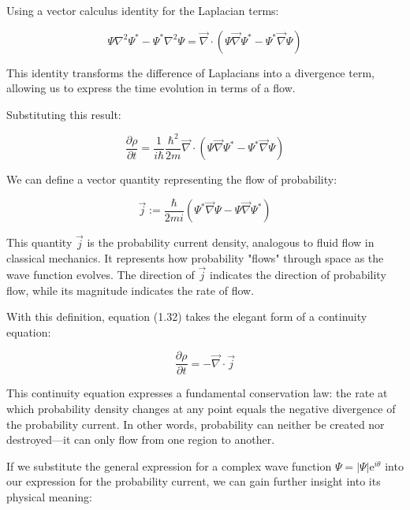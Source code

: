 \documentclass[italian]{HKNdocument}
\begin{document}
Using a vector calculus identity for the Laplacian terms:

\begin{equation*}
\Psi \nabla^{2} \Psi^{*}-\Psi^{*} \nabla^{2} \Psi=\vec{\nabla} \cdot\left(\Psi \vec{\nabla} \Psi^{*}-\Psi^{*} \vec{\nabla} \Psi\right) \tag{1.31}
\end{equation*}

This identity transforms the difference of Laplacians into a divergence term, allowing us to express the time evolution in terms of a flow.

Substituting this result:

\begin{equation*}
\frac{\partial \rho}{\partial t}=\frac{1}{i\hbar}\frac{\hbar^{2}}{2 m} \vec{\nabla} \cdot\left(\Psi \vec{\nabla} \Psi^{*}-\Psi^{*} \vec{\nabla} \Psi\right) \tag{1.32}
\end{equation*}

We can define a vector quantity representing the flow of probability:

\begin{equation*}
\vec{j}:=\frac{\hbar}{2 m i}\left(\Psi^{*} \vec{\nabla} \Psi-\Psi \vec{\nabla} \Psi^{*}\right) \tag{1.33}
\end{equation*}

This quantity $\vec{j}$ is the probability current density, analogous to fluid flow in classical mechanics. It represents how probability "flows" through space as the wave function evolves. The direction of $\vec{j}$ indicates the direction of probability flow, while its magnitude indicates the rate of flow.

With this definition, equation (1.32) takes the elegant form of a continuity equation:

\begin{equation*}
\frac{\partial \rho}{\partial t}=-\vec{\nabla} \cdot \vec{j} \tag{1.34}
\end{equation*}

This continuity equation expresses a fundamental conservation law: the rate at which probability density changes at any point equals the negative divergence of the probability current. In other words, probability can neither be created nor destroyed—it can only flow from one region to another.


If we substitute the general expression for a complex wave function $\Psi=|\Psi| \mathrm{e}^{i \theta}$ into our expression for the probability current, we can gain further insight into its physical meaning:
\end{document}
